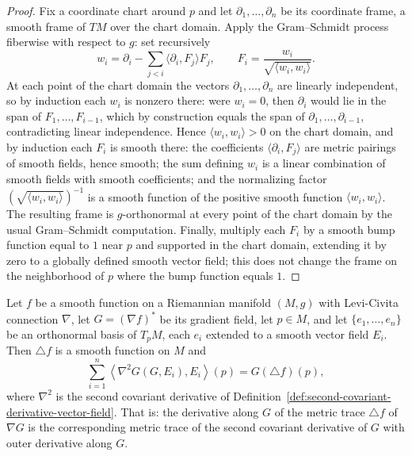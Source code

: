 \begin{proof}
\leanok
Fix a coordinate chart around $p$ and let
$\partial_1,\ldots,\partial_n$ be its coordinate frame, a smooth frame
of $TM$ over the chart domain. Apply the Gram--Schmidt process
fiberwise with respect to $g$: set recursively
$$w_i=\partial_i-\sum_{j<i}\langle\partial_i,F_j\rangle F_j,
\qquad F_i=\frac{w_i}{\sqrt{\langle w_i,w_i\rangle}}.$$
At each point of the chart domain the vectors
$\partial_1,\ldots,\partial_n$ are linearly independent, so by
induction each $w_i$ is nonzero there: were $w_i=0$, then $\partial_i$
would lie in the span of $F_1,\ldots,F_{i-1}$, which by construction
equals the span of $\partial_1,\ldots,\partial_{i-1}$, contradicting
linear independence. Hence $\langle w_i,w_i\rangle>0$ on the chart
domain, and by induction each $F_i$ is smooth there: the coefficients
$\langle\partial_i,F_j\rangle$ are metric pairings of smooth fields,
hence smooth; the sum defining $w_i$ is a linear combination of smooth
fields with smooth coefficients; and the normalizing factor
$\left(\sqrt{\langle w_i,w_i\rangle}\right)^{-1}$ is a smooth function
of the positive smooth function $\langle w_i,w_i\rangle$. The
resulting frame is $g$-orthonormal at every point of the chart domain
by the usual Gram--Schmidt computation. Finally, multiply each $F_i$
by a smooth bump function equal to $1$ near $p$ and supported in the
chart domain, extending it by zero to a globally defined smooth vector
field; this does not change the frame on the neighborhood of $p$ where
the bump function equals $1$.
\end{proof}

\begin{lemma}
\label{lem:laplacian-trace-commutation}
\leanok
Let $f$ be a smooth function on a Riemannian manifold $(M,g)$ with
Levi-Civita connection $\nabla$, let $G=(\nabla f)^*$ be its gradient
field, let $p\in M$, and let $\{e_1,\ldots,e_n\}$ be an orthonormal
basis of $T_pM$, each $e_i$ extended to a smooth vector field $E_i$.
Then $\triangle f$ is a smooth function on $M$ and
$$\sum_{i=1}^n\left\langle\nabla^2G(G,E_i),E_i\right\rangle(p)
=G(\triangle f)(p),$$
where $\nabla^2$ is the second covariant derivative of
Definition~\ref{def:second-covariant-derivative-vector-field}. That
is: the derivative along $G$ of the metric trace $\triangle f$ of
$\nabla G$ is the corresponding metric trace of the second covariant
derivative of $G$ with outer derivative along $G$.
\end{lemma}

